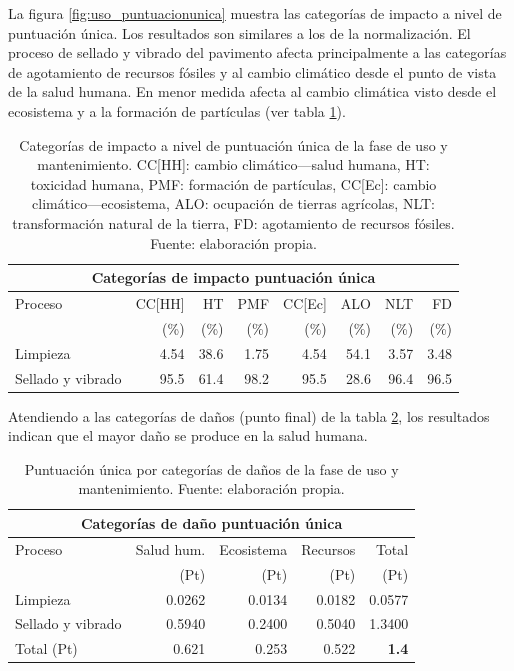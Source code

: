 La figura \ref{fig:uso_puntuacionunica} muestra las categorías de impacto a nivel de puntuación única. Los resultados son similares a los de la normalización. El proceso de sellado y vibrado del pavimento afecta principalmente a las categorías de agotamiento de recursos fósiles y al cambio climático desde el punto de vista de la salud humana. En menor medida afecta al cambio climática visto desde el ecosistema y a la formación de partículas (ver tabla \ref{categoriasimpactousopuntunica}).

\begin{table}[!htb]
\centering
\begin{tabular}{p{4cm}rrrrrrr}
\toprule
\multicolumn{8}{c}{Categorías de impacto puntuación única}\\
\midrule
Proceso & CC[HH] & HT & PMF & CC[Ec] & ALO & NLT & FD\\
 &  (\%) & (\%) & (\%) & (\%) & (\%) & (\%) & (\%)\\
\midrule
Limpieza & 4.54 & 38.6 & 1.75 & 4.54 & 54.1 & 3.57 & 3.48\\
Sellado y vibrado & 95.5 & 61.4 & 98.2 & 95.5 & 28.6 & 96.4 & 96.5\\
\bottomrule
\end{tabular}
\caption[Categorías de impacto a nivel de puntuación única de la fase de uso y mantenimiento.]{Categorías de impacto a nivel de puntuación única de la fase de uso y mantenimiento. CC[HH]: cambio climático—salud humana, HT: toxicidad humana, PMF: formación de partículas, CC[Ec]: cambio climático—ecosistema, ALO: ocupación de tierras agrícolas, NLT: transformación natural de la tierra, FD: agotamiento de recursos fósiles. Fuente: elaboración propia.}
\label{categoriasimpactousopuntunica}
\end{table}

Atendiendo a las categorías de daños (punto final) de la tabla \ref{categoriasdanosuso}, los resultados indican que el mayor daño se produce en la salud humana.

\begin{table}[!htb]
\centering
\begin{tabular}{p{6cm}rrrr}
\toprule
\multicolumn{5}{c}{Categorías de daño puntuación única}\\
\midrule
Proceso & Salud hum. & Ecosistema & Recursos & Total\\
 & (Pt) & (Pt) &  (Pt) & (Pt)\\
\midrule
Limpieza & 0.0262 & 0.0134 & 0.0182 & 0.0577\\
Sellado y vibrado & 0.5940 & 0.2400 & 0.5040 & 1.3400\\
\midrule
Total (Pt) & 0.621 & 0.253 & 0.522 & \textbf{1.4}\\
\bottomrule
\end{tabular}
\caption[Puntuación única por categorías de daños de la fase de uso y mantenimiento.]{Puntuación única por categorías de daños de la fase de uso y mantenimiento. Fuente: elaboración propia.}
\label{categoriasdanosuso}
\end{table}

